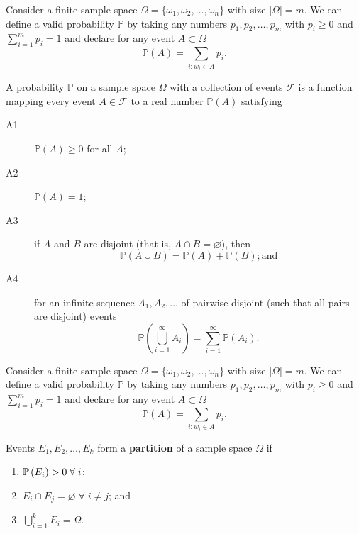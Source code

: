 \begin{example}
    Consider a finite sample space $\Omega = \{ \omega_1, \omega_2, \ldots, \omega_n \}$ with size $|\Omega| = m$. We can define a valid probability $\mathbb{P}$ by taking any numbers $p_1, p_2, \ldots, p_m$ with $p_i \geq 0$ and $\sum_{i = 1}^m p_i = 1$ and declare for any event $A \subset \Omega$ \[ \mathbb{P}(A) = \sum_{i : w_i \in  A} p_i. \]
\end{example}

\begin{definition}
    A probability $\mathbb{P}$ on a sample space $\Omega$ with a collection of events $\mathcal{F}$ is a function mapping every event $A \in \mathcal{F}$ to a real number $\mathbb{P}(A)$ satisfying
    \begin{description}
        \item[A1] $\mathbb{P}(A) \geq 0$ for all $A$;
        \item[A2] $\mathbb{P}(A) = 1$;
        \item[A3] if $A$ and $B$ are disjoint (that is, $A \cap B = \varnothing$), then \[ \mathbb{P}(A \cup B) = \mathbb{P}(A) + \mathbb{P}(B); \text{and} \]
        \item[A4] for an infinite sequence $A_1, A_2, \ldots$ of pairwise disjoint (such that all pairs are disjoint) events \[ \mathbb{P} \left( \bigcup\limits_{i=1}^\infty A_i \right) = \sum_{i=1}^\infty \mathbb{P}(A_i). \]
    \end{description}
\end{definition}

\begin{example}
    Consider a finite sample space $\Omega = \{ \omega_1, \omega_2, \ldots, \omega_n \}$ with size $|\Omega| = m$. We can define a valid probability $\mathbb{P}$ by taking any numbers $p_1, p_2, \ldots, p_m$ with $p_i \geq 0$ and $\sum_{i = 1}^m p_i = 1$ and declare for any event $A \subset \Omega$ \[ \mathbb{P}(A) = \sum_{i : w_i \in  A} p_i. \]
\end{example}

\begin{definition}[Partition]
    Events $E_1, E_2, \ldots, E_k$ form a \textbf{partition} of a sample space $\Omega$ if
    \begin{enumerate}
        \item $\operatorname{\mathbb{P}}{(E_i)} > 0 \; \forall \; i$;
        \item $E_i \cap E_j = \varnothing \; \forall \; i \neq j$; and
        \item $\bigcup_{i = 1}^k E_i = \Omega$.
    \end{enumerate}
\end{definition}


